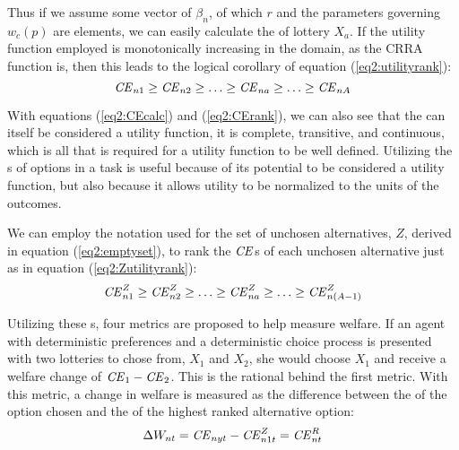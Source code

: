 \documentclass[../main.tex]{subfiles}
\begin{document}
Thus if we assume some vector of $\beta_n$, of which $r$ and the parameters governing $w_c(p)$ are elements, we can easily calculate the {\CE} of lottery $X_a$.{\footnotemark}
If the utility function employed is monotonically increasing in the domain, as the CRRA function is, then this leads to the  logical corollary of equation (\ref{eq2:utilityrank}):
\begin{equation}
	\label{eq2:CErank}
	{\ensuremath{\mathit{CE}}}_{n1} \geq {\ensuremath{\mathit{CE}}}_{n2} \geq \ldots \geq {\ensuremath{\mathit{CE}}}_{na} \geq \ldots \geq {\ensuremath{\mathit{CE}}}_{nA}
\end{equation}

\addtocounter{footnote}{-1}

With equations (\ref{eq2:CEcalc}) and (\ref{eq2:CErank}), we can also see that the {\CE} can itself be considered a utility function, it is complete, transitive, and continuous, which is all that is required for a utility function to be well defined.
Utilizing the {\CE}s of options in a task is useful because of its potential to be considered a utility function, but also because it allows utility to be normalized to the units of the outcomes.

We can employ the notation used for the set of unchosen alternatives, $Z$, derived in equation (\ref{eq2:emptyset}), to rank the ${\mathit{CE}}$s of each unchosen alternative just as in equation (\ref{eq2:Zutilityrank}):
\begin{equation}
	\label{eq2:CEZ}
	{\ensuremath{\mathit{CE}}}_{n1}^Z \geq {\ensuremath{\mathit{CE}}}_{n2}^Z \geq \ldots \geq {\ensuremath{\mathit{CE}}}_{na}^Z \geq \ldots \geq {\ensuremath{\mathit{CE}}}_{n(A-1)}^Z
\end{equation}

Utilizing these {\CE}s, four metrics are proposed to help measure welfare.
If an agent with deterministic preferences and a deterministic choice process is presented with two lotteries to chose from, $X_1$ and $X_2$, she would choose $X_1$ and receive a welfare change of ${\mathit{CE}}_1 - {\mathit{CE}}_2$.
This is the rational behind the first metric.
With this metric, a change in welfare is measured as the difference between the {\CE} of the option chosen and the {\CE} of the highest ranked alternative option:
\begin{equation}
	\label{eq2:WCt}
	\Delta W_{nt} = {\mathit{CE}}_{nyt} - {\mathit{CE}}_{n1t}^Z = {\mathit{CE}}_{nt}^R
\end{equation}
\end{document}
